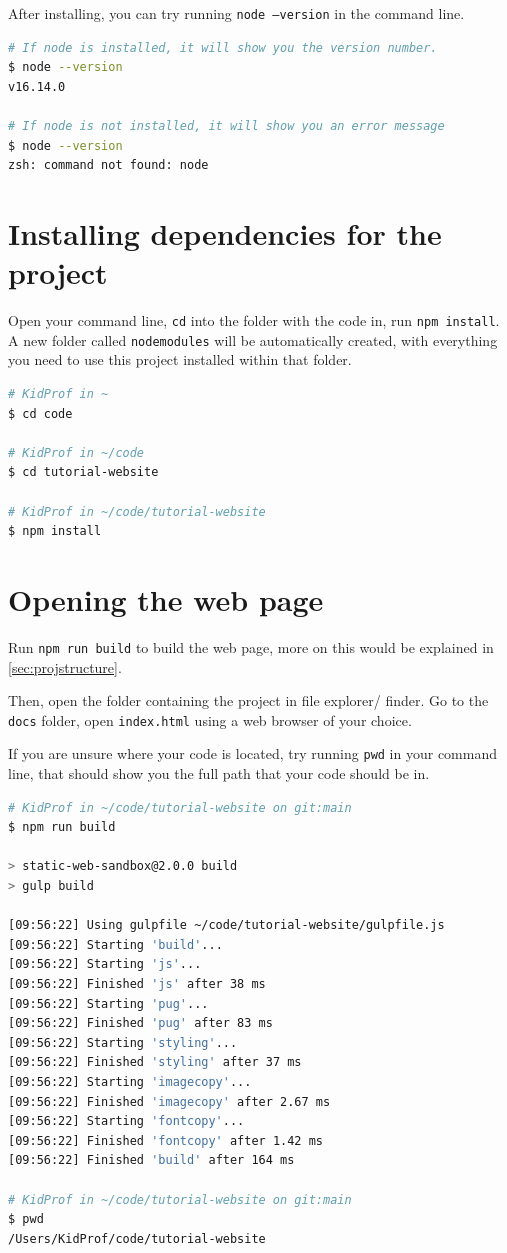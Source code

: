 After installing, you can try running \texttt{node --version} in the command line.

\begin{lstlisting}[language=bash]
# If node is installed, it will show you the version number.
$ node --version
v16.14.0

# If node is not installed, it will show you an error message
$ node --version
zsh: command not found: node
\end{lstlisting}

\section{Installing dependencies for the project}

Open your command line, \texttt{cd} into the folder with the code in, run \texttt{npm install}. A new folder called \texttt{node\textunderscore modules} will be automatically created, with everything you need to use this project installed within that folder.

\begin{lstlisting}[language=bash]
# KidProf in ~
$ cd code

# KidProf in ~/code
$ cd tutorial-website

# KidProf in ~/code/tutorial-website
$ npm install
\end{lstlisting}

\section{Opening the web page}

Run \texttt{npm run build} to build the web page, more on this would be explained in \cref{sec:projstructure}.

Then, open the folder containing the project in file explorer/ finder. Go to the \texttt{docs} folder, open \texttt{index.html} using a web browser of your choice.

If you are unsure where your code is located, try running \texttt{pwd} in your command line, that should show you the full path that your code should be in.

\begin{lstlisting}[language=bash]
# KidProf in ~/code/tutorial-website on git:main 
$ npm run build

> static-web-sandbox@2.0.0 build
> gulp build

[09:56:22] Using gulpfile ~/code/tutorial-website/gulpfile.js
[09:56:22] Starting 'build'...
[09:56:22] Starting 'js'...
[09:56:22] Finished 'js' after 38 ms
[09:56:22] Starting 'pug'...
[09:56:22] Finished 'pug' after 83 ms
[09:56:22] Starting 'styling'...
[09:56:22] Finished 'styling' after 37 ms
[09:56:22] Starting 'imagecopy'...
[09:56:22] Finished 'imagecopy' after 2.67 ms
[09:56:22] Starting 'fontcopy'...
[09:56:22] Finished 'fontcopy' after 1.42 ms
[09:56:22] Finished 'build' after 164 ms

# KidProf in ~/code/tutorial-website on git:main 
$ pwd
/Users/KidProf/code/tutorial-website
\end{lstlisting}

